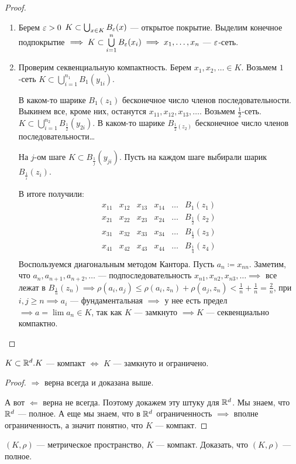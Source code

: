 \begin{proof}
    \begin{enumerate}
        \item Берем $\varepsilon > 0$  $K \subset \bigcup_{x \in K} B_\varepsilon(x)$ --- открытое покрытие. Выделим конечное подпокрытие  $\implies K \subset \bigcup\limits_{i=1}^n B_\varepsilon(x_i) \implies x_1, \ldots, x_n$  --- $\varepsilon$-сеть.
        \item Проверим секвенциальную компактность. Берем  $x_1, x_2, \ldots \in K$. Возьмем $1$-сеть  $K \subset \bigcup_{i=1}^{n_1} B_1(y_{1i})$.

            В каком-то шарике $B_1(z_1)$ бесконечное число членов последовательности. Выкинем все, кроме них, останутся  $x_{11}, x_{12}, x_{13},\ldots$. Возьмем $\frac{1}{2}$-сеть. $K \subset \bigcup\limits_{i=1}^{n_2} B_{\frac{1}{2}}(y_{2i})$. В каком-то шарике $B_{\frac{1}{2}(z_2)}$ бесконечное число членов последовательности\dots

            На $j$-ом шаге  $K \subset B_{\frac{1}{j}}(y_{ji})$. Пусть на каждом шаге выбирали шарик $B_{\frac{1}{i}}(z_i)$.

            В итоге получили:
            \[
            \begin{array}{cccccc}
                x_{11} & x_{12} & x_{13} & x_{14} & \ldots & B_1(z_1)\\
                x_{21} & x_{22} & x_{23} & x_{24} & \ldots & B_{\frac{1}{2}}(z_2)\\
                x_{31} & x_{32} & x_{33} & x_{34} & \ldots & B_{\frac{1}{3}}(z_3)\\
                x_{41} & x_{42} & x_{43} & x_{44} & \ldots & B_{\frac{1}{4}}(z_4)\\
            \end{array}            \] 
            Воспользуемся диагональным методом Кантора. Пусть $a_n \coloneqq x_{nn}$. Заметим, что  $a_n, a_{n+1}, a_{n+2},\ldots$ --- подпоследовательность  $x_{n1}, x_{n 2}, x_{n 3},\ldots \implies$ все лежат в $B_{\frac{1}{n}}(z_n) \implies \rho(a_i, a_j) \le \rho(a_i, z_n) + \rho(a_j, z_n) < \frac{1}{n} + \frac{1}{n} = \frac{2}{n}$, при $i, j \ge n \implies a_i$ --- фундаментальная $\implies$ у нее есть предел  $\implies a = \lim a_n \in K$,  так как $K$ --- замкнуто $\implies K$ --- секвенциально компактно.
    \end{enumerate}
\end{proof}
\begin{consequence}
    $K \subset \mathbb{R}^d. K$ --- компакт  $\iff$  $K$ --- замкнуто и ограничено. 
\end{consequence}
\begin{proof}
    $\Rightarrow$ верна всегда и доказана выше.

    А вот  $\Leftarrow$ верна не всегда. Поэтому докажем эту штуку для  $\mathbb{R}^d$. Мы знаем, что  $\mathbb{R}^d$ --- полное. А еще мы знаем, что в  $\mathbb{R}^d$ ограниченность  $\implies$ вполне ограниченность, а значит понятно, что  $K$ --- компакт.
\end{proof}
\begin{exerc}
    $(K, \rho)$ --- метрическое пространство,  $K$ --- компакт. Доказать, что  $(K, \rho)$ --- полное.
\end{exerc}

